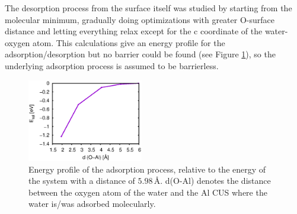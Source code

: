 \documentclass[11pt,DIV=13,BCOR=5mm,a4paper,headinclude]{scrbook}
\begin{document}
The desorption process from the surface itself was studied by starting from the molecular minimum, gradually doing optimizations with greater O-surface distance and letting everything relax except for the c coordinate of the water-oxygen atom.
This calculations give an energy profile for the adsorption/desorption but no barrier could be found (see Figure \ref{abb:0001_desorption}), so the underlying adsorption process is assumed to be barrierless.
  \begin{figure}[!ht]
   \centering
   \includegraphics[width=0.45\textwidth]{figures/0001/mol_ads_barrier.eps}
   \caption{Energy profile of the adsorption process, relative to the energy of the system with a distance of $5.98\,$\AA.
d(O-Al) denotes the distance between the oxygen atom of the water and the Al CUS where the water is/was adsorbed molecularly.
   }
   \label{abb:0001_desorption}
  \end{figure}
\\
\end{document}
